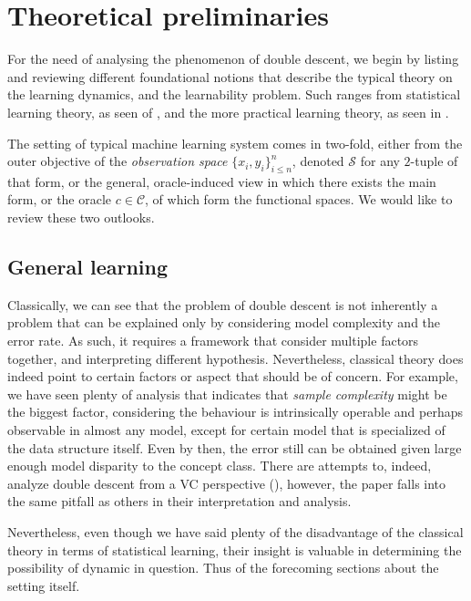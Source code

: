 \documentclass[
  journal=largetwo,
  year=2025,
  volume=37,
]{cup-journal}
\begin{document}
\section{Theoretical preliminaries}

For the need of analysing the phenomenon of double descent, we begin by listing and reviewing different foundational notions that describe the typical theory on the learning dynamics, and the learnability problem. Such ranges from statistical learning theory, as seen of \cite{Vapnik1999-VAPTNO,STL_Hajek_Maxim_2021,10.5555/2371238}, and the more practical learning theory, as seen in \cite{James2021}. 

The setting of typical machine learning system comes in two-fold, either from the outer objective of the \textit{observation space} $\{x_{i},y_{i}\}_{i\leq n}^{n}$, denoted $\mathcal{S}$ for any $2$-tuple of that form, or the general, oracle-induced view in which there exists the main form, or the oracle $c\in\mathcal{C}$, of which form the functional spaces. We would like to review these two outlooks.

\subsection{General learning}

Classically, we can see that the problem of double descent is not inherently a problem that can be explained only by considering model complexity and the error rate. As such, it requires a framework that consider multiple factors together, and interpreting different hypothesis. Nevertheless, classical theory does indeed point to certain factors or aspect that should be of concern. For example, we have seen plenty of analysis that indicates that \textit{sample complexity} might be the biggest factor, considering the behaviour is intrinsically operable and perhaps observable in almost any model, except for certain model that is specialized of the data structure itself. Even by then, the error still can be obtained given large enough model disparity to the concept class. There are attempts to, indeed, analyze double descent from a VC perspective (\cite{lee2022vctheoreticalexplanationdouble}), however, the paper falls into the same pitfall as others in their interpretation and analysis. 

Nevertheless, even though we have said plenty of the disadvantage of the classical theory in terms of statistical learning, their insight is valuable in determining the possibility of dynamic in question. Thus of the forecoming sections about the setting itself.
\end{document}
